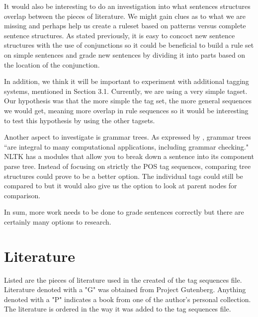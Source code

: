 \documentclass[11pt,a4paper]{article}
\begin{document}
\begin{multicols}{2}
It would also be interesting to do an investigation into what sentences structures overlap between the pieces of literature. We might gain clues as to what we are missing and perhaps help us create a ruleset based on patterns versus complete sentence structures. As stated previously, it is easy to concoct new sentence structures with the use of conjunctions so it could be beneficial to build a rule set on simple sentences and grade new sentences by dividing it into parts based on the location of the conjunction.  

In addition, we think it will be important to experiment with additional tagging systems, mentioned in Section 3.1. Currently, we are using a very simple tagset. Our hypothesis was that the more simple the tag set, the more general sequences we would get, meaning more overlap in rule sequences so it would be interesting to test this hypothesis by using the other tagsets. 

Another aspect to investigate is grammar trees. As expressed by \cite{jurafsky}, grammar trees ``are integral to many computational applications, including grammar checking." NLTK has a modules that allow you to break down a sentence into its component parse tree. Instead of focusing on strictly the POS tag sequences, comparing tree structures could prove to be a better option. The individual tags could still be compared to but it would also give us the option to look at parent nodes for comparison.

In sum, more work needs to be done to grade sentences correctly but there are certainly many options to research.

\newpage




\end{multicols}

\pagebreak

\appendix
\appendixpage

\section{Literature}
Listed are the pieces of literature used in the created of the tag sequences file. Literature denoted with a "G" was obtained from Project Gutenberg. Anything denoted with a "P" indicates a book from one of the author's personal collection. The literature is ordered in the way it was added to the tag sequences file.
\end{document}
